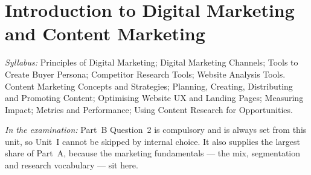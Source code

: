 \chapter{Introduction to Digital Marketing and Content Marketing}

\textit{Syllabus:} Principles of Digital Marketing; Digital Marketing Channels;
Tools to Create Buyer Persona; Competitor Research Tools; Website Analysis
Tools. Content Marketing Concepts and Strategies; Planning, Creating,
Distributing and Promoting Content; Optimising Website UX and Landing Pages;
Measuring Impact; Metrics and Performance; Using Content Research for
Opportunities.

\textit{In the examination:} Part~B Question~2 is compulsory and is always set
from this unit, so Unit~I cannot be skipped by internal choice. It also
supplies the largest share of Part~A, because the marketing fundamentals ---
the mix, segmentation and research vocabulary --- sit here.

\parta


